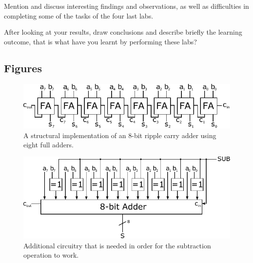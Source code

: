 \documentclass[a4,11pt]{article}
\begin{document}
Mention and discuss interesting findings and observations, as well as difficulties in completing some of the tasks of the four last labs.

After looking at your results, draw conclusions and describe briefly the learning outcome, that is what have you learnt by performing these labs?  

\newpage
\begin{appendix}

\section{Figures}
\label{app:fig}

\begin{figure}[h!]
 	\centering
	\includegraphics[width=1\columnwidth]{Figurer/rca}
  	\caption{A structural implementation of an 8-bit ripple carry adder using eight full adders.}
  	\label{fig:rca}
\end{figure}

\begin{figure}[h!]
 	\centering
	\includegraphics[width=1\columnwidth]{Figurer/sub}
  	\caption{Additional circuitry that is needed in order for the subtraction
		operation to work.}
  	\label{fig:sub}
\end{figure}

\end{appendix}
\end{document}
